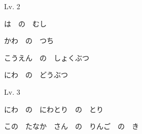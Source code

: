 	\begin{mondai}{Lv. 2}
		\item は　の　むし
		\item かわ　の　つち
		\item こうえん　の　しょくぶつ
		\item にわ　の　どうぶつ
	\end{mondai}
	
	\begin{mondai}{Lv. 3}
		\item にわ　の　にわとり　の　とり
		\item この　たなか　さん　の　りんご　の　き
	\end{mondai}
	



